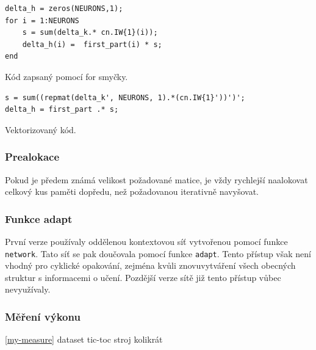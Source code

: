 \documentclass[thesis=M,czech]{FITthesis}[2012/06/26]
\begin{document}
\begin{listing}
\begin{verbatim}
delta_h = zeros(NEURONS,1);
for i = 1:NEURONS
    s = sum(delta_k.* cn.IW{1}(i));
    delta_h(i) =  first_part(i) * s;
end
\end{verbatim} 
\caption{Kód zapsaný pomocí for smyčky.} 
\label{for-code}
\end{listing}

\begin{listing}
\begin{verbatim}
s = sum((repmat(delta_k', NEURONS, 1).*(cn.IW{1}'))')';
delta_h = first_part .* s;
\end{verbatim} 
\caption{Vektorizovaný kód.} 
\label{vector-code}
\end{listing}







\subsubsection*{Prealokace}
Pokud je předem známá velikost požadované matice, je vždy rychlejší naalokovat celkový kus paměti dopředu, než požadovanou iterativně navyšovat\cite{preallocate}.




\subsubsection*{Funkce adapt}
První verze používaly oddělenou kontextovou síť vytvořenou pomocí funkce \texttt{network}. Tato síť se pak doučovala pomocí funkce \texttt{adapt}. Tento přístup však není vhodný pro cyklické opakování, zejména kvůli znovuvytváření všech obecných struktur s informacemi o učení. Pozdější verze sítě již tento přístup vůbec nevyužívaly.


\subsubsection{Měření výkonu}\label{measure}
\ref{my-measure}
dataset
tic-toc
stroj
kolikrát
\end{document}
